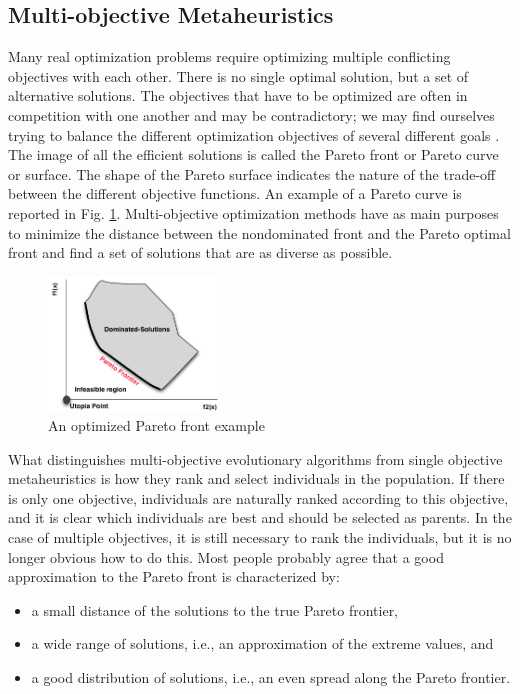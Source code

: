 \documentclass[espaco=umemeio,chapter=TITLE,twoside,openright]{abnt}
\begin{document}
\subsection{Multi-objective Metaheuristics}

Many real optimization problems require optimizing multiple conflicting objectives with each other. There is no single optimal solution, but a set of alternative solutions. The objectives that have to be optimized are often in competition with one another and may be contradictory; we may find ourselves trying to balance the different optimization objectives of several different goals \cite{Harman2010}. The image of all the efficient solutions is called the Pareto front or Pareto curve or surface. The shape of the Pareto surface indicates the nature of the trade-off between the different objective functions. An example of a Pareto curve is reported in Fig. \ref{fig:pareto1}. Multi-objective optimization methods have as main purposes to minimize the distance between the nondominated front and the Pareto optimal front and find a set of solutions that are as diverse as possible.

\begin{figure}[h]
\centering
\includegraphics[width=0.4\textwidth]{./images/paretofront.png}
\caption{An optimized Pareto front example}
\label{fig:pareto1}
\end{figure}

What distinguishes multi-objective evolutionary algorithms from single objective metaheuristics is how they rank and select individuals in the population. If there is only one objective, individuals are naturally ranked according to this objective, and it is clear which individuals are best and should be selected as
parents. In the case of multiple objectives, it is still necessary to rank the individuals, but it is no longer obvious how to do this. Most people probably agree that a good approximation to the Pareto front is characterized by:

\begin{itemize}
\item  a small distance of the solutions to the true Pareto frontier,
\item  a wide range of solutions, i.e., an approximation
of the extreme values, and
\item a good distribution of solutions, i.e., an even
spread along the Pareto frontier.
\end{itemize}
\end{document}
